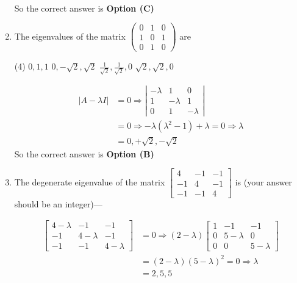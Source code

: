 \begin{enumerate}[label=\color{ocre}\textbf{\arabic*.}]
\begin{answer}
\begin{align*}
		\end{align*}
		So the correct answer is \textbf{Option (C)}
	\end{answer}
	\item  The eigenvalues of the matrix $\left(\begin{array}{lll}0 & 1 & 0 \\ 1 & 0 & 1 \\ 0 & 1 & 0\end{array}\right)$ are
	{}
	\begin{tasks}(4)
		\task[\textbf{A.}] $0,1,1$
		\task[\textbf{B.}] $0,-\sqrt{2}, \sqrt{2}$
		\task[\textbf{C.}]  $\frac{1}{\sqrt{2}}, \frac{1}{\sqrt{2}}, 0$
		\task[\textbf{D.}] $\sqrt{2}, \sqrt{2}, 0$
	\end{tasks}
	\begin{answer}
		\begin{align*}
		|A-\lambda I|&=0 \Rightarrow\left|\begin{array}{ccc}-\lambda & 1 & 0 \\ 1 & -\lambda & 1 \\ 0 & 1 & -\lambda\end{array}\right|\\&=0 \Rightarrow-\lambda\left(\lambda^{2}-1\right)+\lambda=0 \Rightarrow \lambda\\&=0,+\sqrt{2},-\sqrt{2}
		\end{align*}
		So the correct answer is \textbf{Option (B)}
	\end{answer}
	\item    The degenerate eigenvalue of the matrix $\left[\begin{array}{ccc}4 & -1 & -1 \\ -1 & 4 & -1 \\ -1 & -1 & 4\end{array}\right]$ is (your answer should be an
	integer)---
	{}
	\begin{answer}
		\begin{align*}
		\left[\begin{array}{ccc}4-\lambda & -1 & -1 \\ -1 & 4-\lambda & -1 \\ -1 & -1 & 4-\lambda\end{array}\right]&=0 \Rightarrow(2-\lambda)\left[\begin{array}{ccc}1 & -1 & -1 \\ 0 & 5-\lambda & 0 \\ 0 & 0 & 5-\lambda\end{array}\right]\\&=(2-\lambda)(5-\lambda)^{2}=0 \Rightarrow \lambda\\&=2,5,5

\end{align*}
\end{answer}
\end{enumerate}
